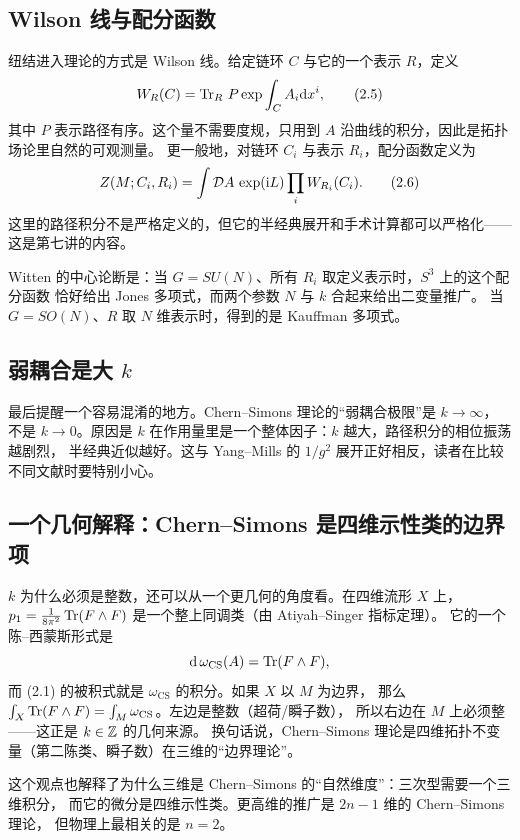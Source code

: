\subsection{Wilson 线与配分函数}

纽结进入理论的方式是 Wilson 线。给定链环 $C$ 与它的一个表示 $R$，定义
\begin{equation}
W_R(C)=\operatorname{Tr}_R\,P\exp\int_C A_i\mathrm{d} x^i, \tag{2.5}
\end{equation}
其中 $P$ 表示路径有序。这个量不需要度规，只用到 $A$ 沿曲线的积分，因此是拓扑场论里自然的可观测量。
更一般地，对链环 $C_i$ 与表示 $R_i$，配分函数定义为
\begin{equation}
Z(M;C_i,R_i)=\int\mathcal{D} A\,\exp(\mathrm{i} L)\prod_i W_{R_i}(C_i). \tag{2.6}
\end{equation}
这里的路径积分不是严格定义的，但它的半经典展开和手术计算都可以严格化——这是第七讲的内容。

Witten 的中心论断是：当 $G=SU(N)$、所有 $R_i$ 取定义表示时，$S^3$ 上的这个配分函数
恰好给出 Jones 多项式，而两个参数 $N$ 与 $k$ 合起来给出二变量推广。
当 $G=SO(N)$、$R$ 取 $N$ 维表示时，得到的是 Kauffman 多项式。

\subsection{弱耦合是大 $k$}

最后提醒一个容易混淆的地方。Chern--Simons 理论的“弱耦合极限”是 $k\to\infty$，
不是 $k\to0$。原因是 $k$ 在作用量里是一个整体因子：$k$ 越大，路径积分的相位振荡越剧烈，
半经典近似越好。这与 Yang--Mills 的 $1/g^2$ 展开正好相反，读者在比较不同文献时要特别小心。

\subsection{一个几何解释：Chern--Simons 是四维示性类的边界项}

$k$ 为什么必须是整数，还可以从一个更几何的角度看。在四维流形 $X$ 上，
$p_1=\frac{1}{8\pi^2}\operatorname{Tr}(F\wedge F)$ 是一个整上同调类（由 Atiyah--Singer 指标定理）。
它的一个陈--西蒙斯形式是
\[
\mathrm{d}\,\omega_{\mathrm{CS}}(A)=\operatorname{Tr}(F\wedge F),
\]
而 (2.1) 的被积式就是 $\omega_{\mathrm{CS}}$ 的积分。如果 $X$ 以 $M$ 为边界，
那么 $\int_X\operatorname{Tr}(F\wedge F)=\int_M\omega_{\mathrm{CS}}$。左边是整数（超荷/瞬子数），
所以右边在 $M$ 上必须整——这正是 $k\in\mathbb{Z}$ 的几何来源。
换句话说，Chern--Simons 理论是四维拓扑不变量（第二陈类、瞬子数）在三维的“边界理论”。

这个观点也解释了为什么三维是 Chern--Simons 的“自然维度”：三次型需要一个三维积分，
而它的微分是四维示性类。更高维的推广是 $2n-1$ 维的 Chern--Simons 理论，
但物理上最相关的是 $n=2$。

